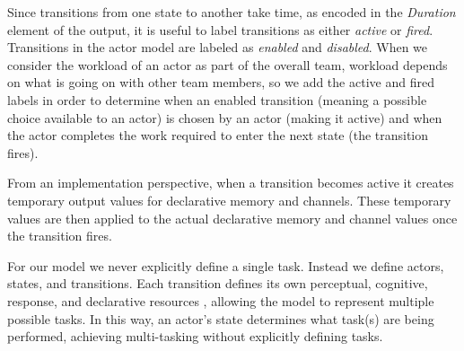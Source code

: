 Since transitions from one state to another take time, as encoded in the {\em Duration} element of the output, it is useful to label transitions as either {\em active} or {\em fired}. Transitions in the actor model are labeled as {\em enabled} and {\em disabled}. When we consider the workload of an actor as part of the overall team, workload depends on what is going on with other team members, so we add the active and fired labels in order to determine when an enabled transition (meaning a possible choice available to an actor) is chosen by an actor (making it active) and when the actor completes the work required to enter the next state (the transition fires).  

From an implementation perspective, when a transition becomes active it creates temporary
output values for declarative memory and channels.  These temporary values are
then applied to the actual declarative memory and channel values once the transition fires.

For our model we never explicitly define a single task.  Instead
we define actors, states, and transitions.  Each transition defines its own
perceptual, cognitive, response, and declarative resources \cite{salvucci2008threaded}, allowing the model to represent multiple possible tasks.  In this way, an actor's state
determines what task(s) are being performed, achieving multi-tasking without
explicitly defining tasks. 




